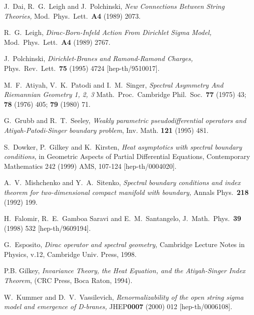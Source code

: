 \documentclass[a4paper,12pt,twoside]{article}
\begin{document}
\begin{thebibliography}{99}
J.~Dai, R.~G.~Leigh and J.~Polchinski,
{\it New Connections Between String Theories,}
Mod.\ Phys.\ Lett.\ {\bf A4} (1989) 2073.

R.~G.~Leigh,
{\it Dirac-Born-Infeld Action From Dirichlet Sigma Model,}
Mod.\ Phys.\ Lett.\ {\bf A4} (1989) 2767.

J.~Polchinski,
{\it Dirichlet-Branes and Ramond-Ramond Charges,}
Phys.\ Rev.\ Lett.\ {\bf 75} (1995) 4724
[hep-th/9510017].

M.~F.~Atiyah, V.~K.~Patodi and I.~M.~Singer,
{\it Spectral Asymmetry And Riemannian Geometry 1, 2, 3}
Math.\ Proc.\ Cambridge Phil.\ Soc.\ 
{\bf 77} (1975) 43;
{\bf 78} (1976) 405;
{\bf 79} (1980) 71.

G.~Grubb and R.~T.~Seeley, 
{\it Weakly parametric pseudodifferential operators and 
Atiyah-Patodi-Singer boundary problem},
Inv. Math. {\bf 121} (1995) 481.

S.~Dowker, P.~Gilkey and K.~Kirsten,
{\it Heat asymptotics with spectral boundary conditions,}
in Geometric Aspects of Partial Differential Equations, 
Contemporary Mathematics 242 (1999)
AMS, 107-124
[hep-th/0004020].

A.~V.~Mishchenko and Y.~A.~Sitenko,
{\it Spectral boundary conditions and index 
theorem for two-dimensional compact manifold with boundary,}
Annals Phys.\ {\bf 218} (1992) 199.

H.~Falomir, R.~E.~Gamboa Saravi and E.~M.~Santangelo,
J.\ Math.\ Phys.\ {\bf 39} (1998) 532
[hep-th/9609194].

G.~Esposito,
{\it Dirac operator and spectral geometry,}
Cambridge Lecture Notes in Physics, v.12,
Cambridge Univ. Press, 1998.

 P.B. Gilkey, 
\textit{Invariance Theory, the Heat Equation, and the Atiyah-Singer
Index Theorem}, (CRC Press, Boca Raton, 1994).

W.~Kummer and D.~V.~Vassilevich,
{\it Renormalizability of the open string sigma 
model and emergence of  D-branes,}
JHEP{\bf 0007} (2000) 012
[hep-th/0006108].


\end{thebibliography}
\end{document}
